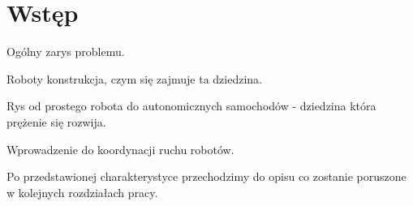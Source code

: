 \chapter{Wstęp}

Ogólny zarys problemu.

Roboty konstrukcja, czym się zajmuje ta dziedzina.

Rys od prostego robota do autonomicznych samochodów - dziedzina która prężenie się rozwija.

Wprowadzenie do koordynacji ruchu robotów.

Po przedstawionej charakterystyce przechodzimy do opisu co zostanie poruszone w kolejnych rozdziałach pracy.